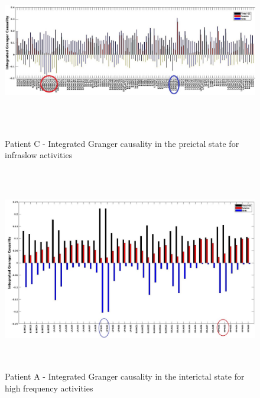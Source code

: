 \begin{figure}
\centerline{
	\includegraphics[height =3in]{Plots/Patient_C_preictal_low.jpg}
	}

	\caption{Patient C - Integrated Granger causality in the preictal state for infraslow activities}

	\label{fig:apdx_patient_c_preictal_low}
\end{figure}



\begin{figure}
\centerline{
	\includegraphics[height =3.5in]{Plots/Patient_A_interictal_high.jpg}
	}

	\caption{Patient A - Integrated Granger causality in the interictal state for high frequency activities}

	\label{fig:apdx_patient_a_interictal_high}
\end{figure}


